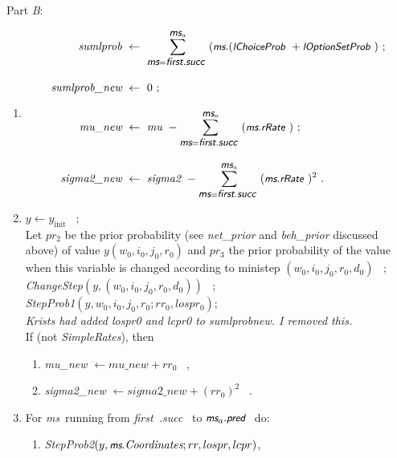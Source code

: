 \documentclass[a4paper,12pt,fleqn]{article}
\newcommand{\nnm}[1]{\textsf{\small\textit{#1}\ }}
\newcommand{\ms}{\textsl{\textsf{\small ms}}} %
\newcommand{\remark}[1]{{\textcolor[named]{Red}{#1}}}
\begin{document}
\newpage
Part \emph{B}:\\
\begin{enumerate}[resume]
\item \label{item7}
   \begin{align*}
       \textit{sumlprob} \ & \leftarrow \ \sum_{\ms = \nnm{first.succ}}^{\ms_a}
             (\ms.(\nnm{lChoiceProb} + \nnm{lOptionSetProb}) \ ; \\[1em]
       \textit{sumlprob\_new} \ & \leftarrow \ 0 \ ;   \\[1em]
      \textit{mu\_new}  \ & \leftarrow \ \textit{mu} \ -
                \sum_{\ms = \nnm{first.succ}}^{ \ms_a}
                        (\ms.\nnm{rRate}) \ ; \\[1em]
      \textit{sigma2\_new} \ & \leftarrow \ \textit{sigma2} \ -
                \sum_{\ms = \nnm{first.succ}}^{\ms_a}
                          (\ms.\nnm{rRate})^2 \ .
      \end{align*}
\vspace*{-1em}
\item  $y \leftarrow y_{\text{init}}$ \ ;\\[1em]
      Let $pr_2$ be the prior probability
      (see \textit{net\_prior} and \textit{beh\_prior} discussed above)
      of value $y(w_0,i_0,j_0,r_0)$
      and $pr_3$ the prior probability of the value when
      this variable is changed according to ministep
      $(w_0,i_0,j_0,r_0,d_0)$ \ ;\\[1em]
      \textit{ChangeStep}$(y, (w_0,i_0,j_0,r_0,d_0))$ \ ; \\[1em]
 \textit{StepProb1}$(y,w_0,i_0,j_0,r_0;  rr_0, lospr_0)$;\\
 \emph{Krists had added lospr0 and lcpr0 to sumlprobnew. I removed this.}\\[1em]
     If (not \textit{SimpleRates}), then
      \begin{enumerate}
      \item \textit{mu\_new} $ \leftarrow  \textit{mu\_new} + rr_0 $ \ ,
      \item \textit{sigma2\_new} $ \leftarrow
                   \textit{sigma2\_new}  + (rr_0)^2  $ \ .
      \end{enumerate}
\item For \ms \ running from \nnm{\nnm{first}.succ} to $\ms_a.\nnm{pred}$ do:
      \begin{enumerate}
      \item \textit{StepProb2}$(y, \ms.\textit{Coordinates}; rr, lospr, lcpr)$, \\

\end{enumerate}
\end{enumerate}
\end{document}
